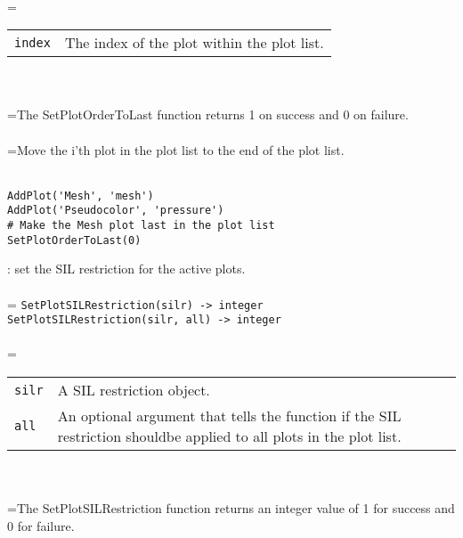 \documentclass[10pt,a4paper]{report}
\begin{document}
 \\ 
\hangindent=\parindent 
\begin{tabular}{lp{9cm}}
\verb!index! & The index of the plot within the plot list. \\
\end{tabular} \\[-2mm]


 \\ 
\hangindent=\parindent The SetPlotOrderToLast function returns 1 on success and 0 on failure. \\[-3mm] 

 \\ 
\hangindent=\parindent Move the i'th plot in the plot list to the end of the plot list. \\[-3mm] 

\\[-6mm]
\begin{verbatim}AddPlot('Mesh', 'mesh')
AddPlot('Pseudocolor', 'pressure')
# Make the Mesh plot last in the plot list
SetPlotOrderToLast(0)
\end{verbatim}
\newpage


{}
: set the SIL restriction for the active plots.\\[-3mm]

 \\ 
\hangindent=\parindent 
\verb!SetPlotSILRestriction(silr) -> integer!\\ 
\verb!SetPlotSILRestriction(silr, all) -> integer!\\ [-3mm]

 \\ 
\hangindent=\parindent 
\begin{tabular}{lp{9cm}}
\verb!silr! & A SIL restriction object. \\
\verb!all! & An optional argument that tells the function if the SIL restriction shouldbe applied to all plots in the plot list. \\
\end{tabular} \\[-2mm]


 \\ 
\hangindent=\parindent The SetPlotSILRestriction function returns an integer value of 1 for success and 0 for failure. \\[-3mm] 
\end{document}
